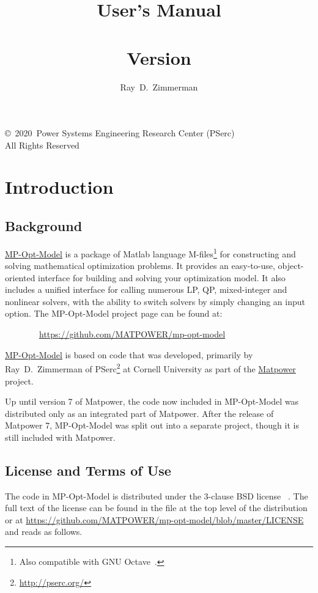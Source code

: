 \documentclass[12pt]{article}
\title{{\huge \bfseries \mpomname{} User's Manual } \\ ~ \\ \LARGE Version \mpomver{}}
\author{Ray~D.~Zimmerman}
\newcommand{\matlab}[0]{{\sc Matlab}}
\newcommand{\matpower}[0]{{\sc Matpower}}
\newcommand{\matpowerurl}[0]{https://matpower.org}
\newcommand{\matpowerlink}[0]{\href{\matpowerurl}{\matpower{}}}
\newcommand{\mpom}[0]{\mbox{MP-Opt-Model}}
\newcommand{\mpomurl}[0]{https://github.com/MATPOWER/mp-opt-model}
\newcommand{\mpomlink}[0]{\href{\mpomurl}{\mpom{}}}
\newcommand{\pserc}[0]{{\sc PSerc}}
\newcommand{\PSERC}[0]{{Power Systems Engineering Research Center (\pserc{})}}
\newcommand{\code}[1]{{\relsize{-0.5}{\tt{{#1}}}}}  %
\numberwithin{equation}{section}
\numberwithin{table}{section}
\numberwithin{figure}{section}
\begin{document}
\maketitle
\thispagestyle{empty}
\vfill
\begin{center}
{\scriptsize
\copyright~2020~\PSERC{}\\
All Rights Reserved}
\end{center}

\clearpage
\tableofcontents
\clearpage
\listoftables

\clearpage
\section{Introduction}

\subsection{Background}

\mpomlink{} is a package of \matlab{} language M-files\footnote{Also compatible with GNU Octave~\cite{octave}.} for constructing and solving mathematical optimization problems. It provides an easy-to-use, object-oriented interface for building and solving your optimization model. It also includes a unified interface for calling numerous LP, QP, mixed-integer and nonlinear solvers, with the ability to switch solvers by simply changing an input option.
The \mpom{} project page can be found at:

\bigskip

~~~~~~~~\url{\mpomurl}

\bigskip

\mpomlink{} is based on code that was developed, primarily by Ray~D.~Zimmerman of \pserc{}\footnote{\url{http://pserc.org/}} at Cornell University as part of the \matpowerlink{}~\cite{zimmerman2011,matpower} project.

Up until version 7 of \matpower{}, the code now included in \mpom{} was distributed only as an integrated part of \matpower{}. After the release of \matpower{} 7, \mpom{} was split out into a separate project, though it is still included with \matpower{}.

\clearpage
\subsection{License and Terms of Use}

The code in \mpom{} is distributed under the 3-clause BSD license
~\cite{bsd}. The full text of the license can be found in the \code{LICENSE} file at the top level of the distribution or at \url{https://github.com/MATPOWER/mp-opt-model/blob/master/LICENSE} and reads as follows.
\end{document}
